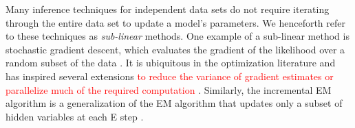 Many inference techniques for independent data sets do not require iterating through the entire data set to update a model’s parameters. We henceforth refer to these techniques as \textit{sub-linear} methods. %
%
One example of a sub-linear method is stochastic gradient descent, which %
evaluates the gradient of the likelihood over a random subset of the data \citep{Robbins:1951}. It is ubiquitous in the optimization literature and has inspired several extensions \textcolor{red}{to reduce the variance of gradient estimates \citep{Johnson:2013, Defazio:2014, Kingma:2014} or parallelize much of the required computation \citep{Zinkevich:2010}}. %
%
Similarly, the incremental EM algorithm is a generalization of the EM algorithm %
that updates only a subset of hidden variables at each E step \citep{Neal:1998, Thiesson:2001, Karimi:2019}. %
%
